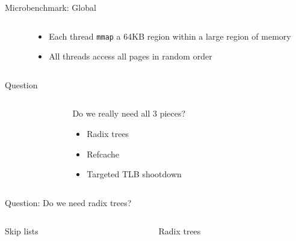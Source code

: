 \documentclass[aspectratio=169]{beamer}
\newcommand{\bi}{\begin{itemize}}
\newcommand{\ei}{\end{itemize}}
\begin{document}
\begin{frame}{Microbenchmark: Global}
  \begin{columns}[T]
    \begin{column}{0.5\textwidth}
      
    \end{column}
    \begin{column}{0.5\textwidth}
      \bi
    \item Each thread \texttt{mmap} a 64KB region within a large region of memory
    \item All threads access all pages in random order
      \ei
    \end{column}
  \end{columns}
\end{frame}

\begin{frame}{Question}
  \begin{columns}[T]
    \begin{column}{0.3\textwidth}
    \end{column}
    \begin{column}{0.4\textwidth}
      Do we really need all 3 pieces?
      \bi
    \item Radix trees
    \item Refcache
    \item Targeted TLB shootdown
      \ei
    \end{column}
    \begin{column}{0.3\textwidth}
    \end{column}
  \end{columns}
\end{frame}

\begin{frame}{Question: Do we need radix trees?}
  \begin{columns}[T]
    \begin{column}{0.5\textwidth}
      \begin{center}
        Skip lists\\
        
      \end{center}
    \end{column}
    \begin{column}{0.5\textwidth}
      \begin{center}
        Radix trees\\
        
      \end{center}
    \end{column}
  \end{columns}
\end{frame}
\end{document}
